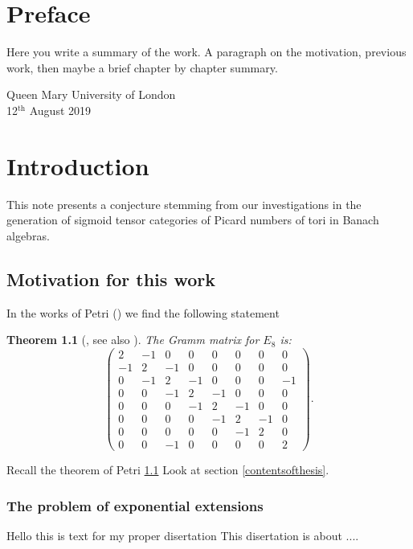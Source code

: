 \documentclass[12pt, oneside]{book}
\theoremstyle{plain}
\newtheorem{theorem}{Theorem}[section]
\theoremstyle{definition}
\begin{document}
\chapter*{Preface}
Here  you write a summary of the work. A paragraph on the motivation, previous work, then maybe a brief chapter by chapter summary. 

\lipsum[100]%



\begin{flushright}
Queen Mary University of London\\
12${}^{\text{th}}$ August 2019
\end{flushright}


\tableofcontents

\chapter{Introduction}
This note presents a conjecture stemming from our investigations in the generation of sigmoid tensor categories of Picard numbers of tori in Banach algebras.
\lipsum[20]
 
\section{Motivation for this work}
In the works of Petri (\cite[Theorem 2.3]{Petri}) we find the following statement

\begin{theorem}[{\cite[Theorem 2.3]{Petri}, see also \cite[pg. 45]{BlackScholes}}]\label{PetriTheorem}
The Gramm matrix for $E_8$ is:
$$
\begin{pmatrix}
2	&-1&0	&0	&0	&0	&0	&0\\
-1	&2	&-1	&0	&0	&0	&0	&0\\
0	&-1	&2	&-1	&0	&0	&0	&-1\\
0	&0	&-1	&2	&-1	&0	&0	&0\\
0	&0	&0	&-1	&2	&-1	&0	&0\\
0	&0	&0	&0	&-1	&2	&-1	&0\\
0	&0	&0	&0	&0	&-1	&2	&0\\
0	&0	&-1	&0	&0	&0	&0	&2
\end{pmatrix}.
$$
\end{theorem}


Recall the theorem of Petri \ref{PetriTheorem}
Look at section \ref{contentsofthesis}.

\subsection{The problem of exponential extensions}
Hello this is text for my proper disertation This disertation is about ....
\end{document}
